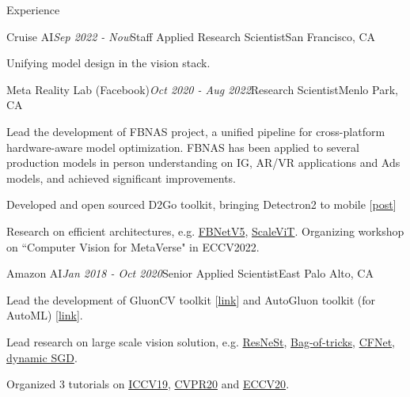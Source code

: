 \documentclass{resume} %
\begin{document}
\begin{rSection}{Experience}

\begin{rSubsection}{Cruise AI}{\em Sep 2022 - Now}{Staff Applied Research Scientist}{San Francisco, CA}
\item Unifying model design in the vision stack.
\end{rSubsection}

\begin{rSubsection}{Meta Reality Lab (Facebook)}{\em Oct 2020 - Aug 2022}{Research Scientist}{Menlo Park, CA} %
\item Lead the development of FBNAS project, a unified pipeline for cross-platform hardware-aware model optimization. FBNAS has been applied to several production models in person understanding on IG, AR/VR applications and Ads models, and achieved significant improvements.
\item Developed and open sourced D2Go toolkit, bringing Detectron2 to mobile [\href{https://ai.facebook.com/blog/d2go-brings-detectron2-to-mobile/}{post}]
\item Research on efficient architectures, e.g. \href{https://scholar.google.com/citations?view_op=view_citation&hl=en&user=gCoWdkUAAAAJ&sortby=pubdate&citation_for_view=gCoWdkUAAAAJ:ML0RJ9NH7IQC}{FBNetV5}, \href{https://scholar.google.com/citations?view_op=view_citation&hl=en&user=gCoWdkUAAAAJ&sortby=pubdate&citation_for_view=gCoWdkUAAAAJ:p__nRnzSRKYC}{ScaleViT}. Organizing workshop on ``Computer Vision for MetaVerse" in ECCV2022.
\end{rSubsection}

\begin{rSubsection}{Amazon AI}{\em Jan 2018 - Oct 2020}{Senior Applied Scientist}{East Palo Alto, CA} %
\item Lead the development of GluonCV toolkit [\href{https://cv.gluon.ai/contents.html}{link}] and AutoGluon toolkit (for AutoML) [\href{https://auto.gluon.ai/stable/index.html}{link}]. 
\item Lead research on large scale vision solution, e.g. \href{https://scholar.google.com/citations?view_op=view_citation&hl=en&user=gCoWdkUAAAAJ&citation_for_view=gCoWdkUAAAAJ:0KyAp5RtaNEC}{ResNeSt}, \href{https://scholar.google.com/citations?view_op=view_citation&hl=en&user=gCoWdkUAAAAJ&citation_for_view=gCoWdkUAAAAJ:fEOibwPWpKIC}{Bag-of-tricks}, \href{https://scholar.google.com/citations?view_op=view_citation&hl=en&user=gCoWdkUAAAAJ&citation_for_view=gCoWdkUAAAAJ:-_dYPAW6P2MC}{CFNet}, \href{https://scholar.google.com/citations?view_op=view_citation&hl=en&user=gCoWdkUAAAAJ&sortby=pubdate&citation_for_view=gCoWdkUAAAAJ:35r97b3x0nAC}{dynamic SGD}. 
\item Organized 3 tutorials on \href{https://iccv2019.thecvf.com/program/tutorials}{ICCV19}, \href{http://hangzhang.org/CVPR2020/}{CVPR20} and \href{https://hangzhang.org/ECCV2020/}{ECCV20}. 
\end{rSubsection}


\end{rSection}
\end{document}
